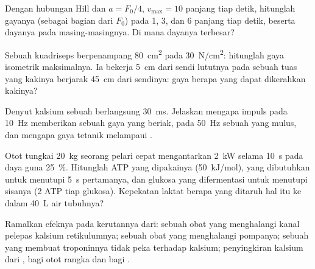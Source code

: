 \begin{exercise}[$\star\star$]\label{exo:b2:muscle-movement:7}
Dengan hubungan Hill dan $a = F_0/4$, $v_{\max} = 10$ panjang tiap
detik, hitunglah gayanya (sebagai bagian dari $F_0$) pada 1, 3, dan 6
panjang tiap detik, beserta dayanya pada masing-masingnya. Di mana
dayanya terbesar?
\end{exercise}

\begin{exercise}[$\star\star$]\label{exo:b2:muscle-movement:8}
Sebuah kuadriseps berpenampang \qty{80}{cm^2} pada \qty{30}{N/cm^2}:
hitunglah gaya isometrik maksimalnya. Ia bekerja \qty{5}{cm} dari sendi
lututnya pada sebuah tuas yang kakinya berjarak \qty{45}{cm} dari
sendinya: gaya berapa yang dapat dikerahkan kakinya?
\end{exercise}

\begin{exercise}[$\star\star$]\label{exo:b2:muscle-movement:9}
Denyut kalsium sebuah  berlangsung \qty{30}{ms}. Jelaskan
mengapa impuls pada \qty{10}{Hz} memberikan sebuah gaya yang beriak,
pada \qty{50}{Hz} sebuah  yang mulus, dan mengapa gaya tetanik
melampaui .
\end{exercise}

\begin{exercise}[$\star\star\star$]\label{exo:b2:muscle-movement:10}
Otot tungkai \qty{20}{kg} seorang pelari cepat mengantarkan \qty{2}{kW}
selama \qty{10}{s} pada daya guna \qty{25}{\%}. Hitunglah ATP yang
dipakainya (\qty{50}{kJ/mol}),  yang dibutuhkan untuk
menutupi \qty{5}{s} pertamanya, dan glukosa yang difermentasi untuk
menutupi sisanya (2 ATP tiap glukosa). Kepekatan laktat berapa yang
ditaruh hal itu ke dalam \qty{40}{L} air tubuhnya?
\end{exercise}

\begin{exercise}[$\star\star\star$]\label{exo:b2:muscle-movement:11}
Ramalkan efeknya pada kerutannya dari: sebuah obat yang menghalangi
kanal pelepas kalsium retikulumnya; sebuah obat yang menghalangi
pompanya; sebuah  yang membuat troponinnya tidak peka terhadap
kalsium; penyingkiran kalsium dari , bagi otot rangka dan bagi
.
\end{exercise}

